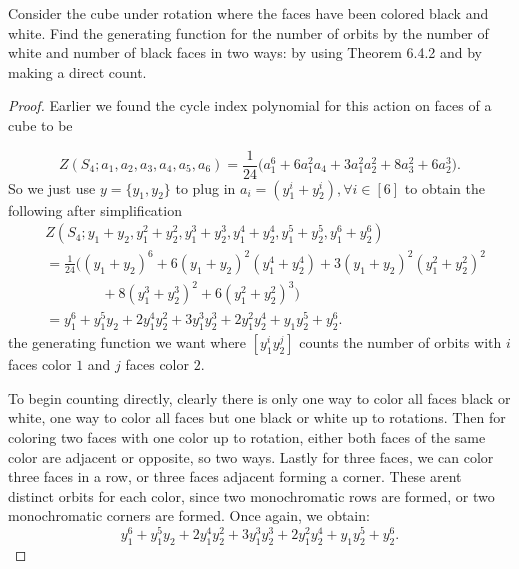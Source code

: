 \documentclass[addpoints,10pt]{exam}
\theoremstyle{plain}
\theoremstyle{definition}
\newtheorem{prob}[thm]{Problem}
\theoremstyle{plain}
\theoremstyle{plain}
\theoremstyle{definition}
\let\oldprob\prob
\let\endoldprob\endprob
\renewenvironment{prob}
  {\begin{singlespace}\oldprob}
  {\endoldprob\end{singlespace}}
\begin{document}
\newpage
\setcounter{thm}{14}
\renewcommand{\thethm}{\arabic{thm}(b)}
\begin{prob}
Consider the cube under rotation where the faces have been colored black and
white. Find the generating function for the number of orbits by the number
of white and number of black faces in two ways: by using Theorem 6.4.2 and
by making a direct count.
\end{prob}

\begin{proof}
Earlier we found the cycle index polynomial for this action on faces of a cube to be

\[
Z(S_{4};a_1,a_2,a_3,a_4,a_5,a_6)
= \frac{1}{24}\Big(
  a_1^6
  + 6 a_1^2 a_4
  + 3 a_1^2 a_2^2
  + 8 a_3^2
  + 6 a_2^3
\Big).
\]
 So we just use $y=\{y_{1},y_{2}\}$ to plug in $a_{i}=(y_{1}^{i}+y_{2}^{i}),\forall i\in [6]$ to obtain the following after simplification
\begin{align*}
&Z(S_4;y_1+y_2,y_1^2+y_2^2,y_1^3+y_2^3,y_1^4+y_2^4,y_1^5+y_2^5,y_1^6+y_2^6)\\
&=\frac{1}{24}\Big(
(y_1+y_2)^6
+6(y_1+y_2)^2(y_1^4+y_2^4)
+3(y_1+y_2)^2(y_1^2+y_2^2)^2\\
&\qquad\qquad
+8(y_1^3+y_2^3)^2
+6(y_1^2+y_2^2)^3
\Big)\\
&=
y_1^6+y_1^5y_2+2y_1^4y_2^2
+3y_1^3y_2^3
+2y_1^2y_2^4+y_1y_2^5+y_2^6.
\end{align*}
the generating function we want where $[y_{1}^{i}y_{2}^{j}]$ counts the number of orbits with $i$ faces color $1$ and $j$ faces color $2$.

To begin counting directly, clearly there is only one way to color all faces black or white, one way to color all faces but one black or white up to rotations. Then for coloring two faces with one color up to rotation, either both faces of the same color are adjacent or opposite, so two ways. Lastly for three faces, we can color three faces in a row, or three faces adjacent forming a corner. These arent distinct orbits for each color, since two monochromatic rows are formed, or two monochromatic corners are formed. Once again, we obtain:
$$y_1^6+y_1^5y_2+2y_1^4y_2^2
+3y_1^3y_2^3
+2y_1^2y_2^4+y_1y_2^5+y_2^6.$$
\end{proof}
\newpage
\setcounter{thm}{30}
\renewcommand{\thethm}{\arabic{thm}(a)}
\end{document}
